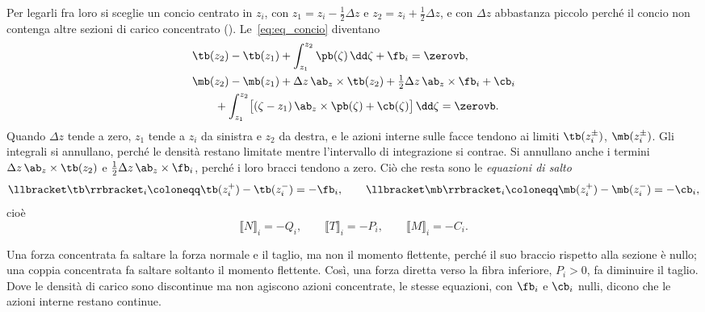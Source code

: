 Per legarli fra loro si sceglie un concio centrato in
$z_i$, con $z_1 = z_i - \tfrac{1}{2}\Delta z$ e
$z_2 = z_i + \tfrac{1}{2}\Delta z$, e con $\Delta z$
abbastanza piccolo perché il concio non contenga altre
sezioni di carico concentrato ().
Le~\eqref{eq:eq_concio} diventano
\begin{equation*}
	\begin{aligned}
		&\tb(z_2) - \tb(z_1)
		+ \int_{z_1}^{z_2} \pb(\zeta)\,\dd\zeta
		+ \fb_i = \zerovb,\\
		&\mb(z_2) - \mb(z_1)
		+ \Delta z\,\ab_z \times \tb(z_2)
		+ \tfrac{1}{2}\Delta z\,\ab_z \times \fb_i + \cb_i\\
		&\qquad + \int_{z_1}^{z_2}
		\bigl[(\zeta - z_1)\,\ab_z \times \pb(\zeta) + \cb(\zeta)\bigr]\,\dd\zeta
		= \zerovb.
	\end{aligned}
\end{equation*}
Quando $\Delta z$ tende a zero, $z_1$ tende a $z_i$ da
sinistra e $z_2$ da destra, e le azioni interne sulle
facce tendono ai limiti $\tb(z_i^\pm)$, $\mb(z_i^\pm)$.
Gli integrali si annullano,
perché le densità restano limitate mentre l'intervallo di
integrazione si contrae. Si annullano anche i termini
$\Delta z\,\ab_z \times \tb(z_2)$ e
$\tfrac{1}{2}\Delta z\,\ab_z \times \fb_i$, perché i loro
bracci tendono a zero. Ciò che resta sono le
\emph{equazioni di salto}
\begin{equation*}
	\llbracket \tb \rrbracket_i \coloneqq
	\tb(z_i^+) - \tb(z_i^-) = -\fb_i, \qquad
	\llbracket \mb \rrbracket_i \coloneqq
	\mb(z_i^+) - \mb(z_i^-) = -\cb_i,
\end{equation*}
cioè
\begin{equation}\label{eq:salto_NTM}
	\llbracket N \rrbracket_i = -Q_i, \qquad
	\llbracket T \rrbracket_i = -P_i, \qquad
	\llbracket M \rrbracket_i = -C_i.
\end{equation}

Una forza concentrata fa saltare la forza normale e il
taglio, ma non il momento flettente, perché il suo
braccio rispetto alla sezione è nullo; una coppia
concentrata fa saltare soltanto il momento flettente.
Così, una forza diretta verso la fibra inferiore,
$P_i > 0$, fa diminuire il taglio. Dove le densità di
carico sono discontinue ma non agiscono azioni
concentrate, le stesse equazioni, con $\fb_i$ e $\cb_i$
nulli, dicono che le azioni interne restano continue.



